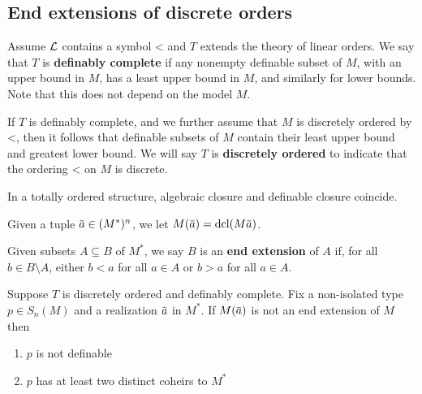 \documentclass[11pt]{article}
\begin{document}
\subsection{End extensions of discrete orders}
\label{sec:org9fc8071}
Assume \(\mathcal{L}\) contains a symbol < and \(T\) extends the theory of linear orders. We say
that \(T\) is \textbf{definably complete} if any nonempty definable subset
of \(M\), with an upper bound in \(M\), has a least upper bound in \(M\), and similarly for
lower bounds. Note that this does not depend on the model \(M\).

If \(T\) is definably complete, and we further assume that \(M\) is discretely ordered by <,
then it follows that definable subsets of \(M\) contain their least upper bound and greatest
lower bound. We will say \(T\) is \textbf{discretely ordered} to indicate that the ordering < on \(M\) is
discrete.

In a totally ordered structure, algebraic closure and definable closure coincide.

Given a tuple \(\bara\in(M^*)^n\), we let \(M(\bara)=\dcl(M\bara)\).

\begin{definition}[]
Given subsets \(A\subseteq B\) of \(M^*\), we say \(B\) is an \textbf{end extension} of \(A\) if, for
all \(b\in B\setminus A\), either \(b<a\) for all \(a\in A\) or \(b>a\) for all \(a\in A\).
\end{definition}

\begin{lemma}[]
\label{0.3}
Suppose \(T\) is discretely ordered and definably complete. Fix a non-isolated
type \(p\in S_n(M)\) and a realization \(\bara\) in \(M^*\). If \(M(\bara)\) is not an end
extension of \(M\) then
\begin{enumerate}
\item \(p\) is not definable
\item \(p\) has at least two distinct coheirs to \(M^*\)
\end{enumerate}
\end{lemma}
\end{document}
